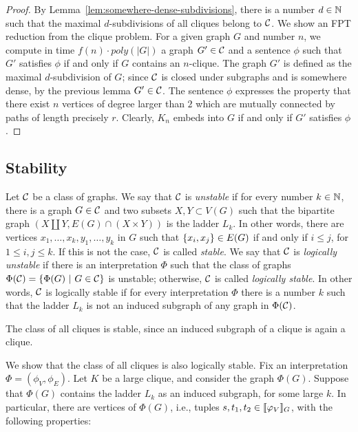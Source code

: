 \begin{proof}
  By Lemma~\ref{lem:somewhere-dense-subdivisions}, there is a number  $d\in\mathbb{N}$  such that the maximal $d$-subdivisions
  of all cliques belong to ${\cal C}$. 
  We show an FPT reduction 
    from the clique problem. For a given graph $G$ and number $n$, we compute in time $f(n)\cdot poly(|G|)$ a graph $G'\in{\cal C}$ and a sentence $\phi$ such that $G'$ satisfies $\phi$ if and only if $G$ contains an $n$-clique.
   The graph $G'$ is defined as the maximal $d$-subdivision of $G$; since ${\cal C}$ is closed under subgraphs and is somewhere dense, by the previous lemma $G'\in{\cal C}$. The sentence $\phi$ expresses the property that there exist $n$ vertices of degree larger than $2$ which 
  are mutually connected by paths of length precisely $r$.
  Clearly, $K_n$ embeds into $G$ if and only if $G'$
  satisfies $\phi$.
\end{proof}

\subsection{Stability}
Let ${\cal C}$ be a class of graphs.
We say that ${\cal C}$ is \emph{unstable} 
if for every number $k\in\mathbb{N}$, there is a  graph  $G\in{\cal C}$
and two subsets $X,Y\subset V(G)$
such that the bipartite graph $(X\coprod Y,E(G)\cap (X\times Y))$
is the ladder $L_k$. In other words, there are vertices $x_1,\ldots,x_k,y_1,\ldots,y_k$ in $G$ such that $\{x_i,x_j\}\in E(G)$ if and only if $i\le j$, for $1\le i,j\le k$.
If this is not the case, ${\cal C}$ is called \emph{stable}.
We say that ${\cal C}$ is \emph{logically unstable}
if there is an interpretation $\Phi$
such that the class of graphs $\Phi({\cal C})=\{\Phi(G)\ |\ G\in{\cal C}\}$
is unstable; otherwise, ${\cal C}$ is called \emph{logically stable}.
In other words, ${\cal C}$ is logically stable if for every
interpretation $\Phi$ there is a number $k$
such that the ladder $L_k$ is not an induced subgraph of any graph in $\Phi({\cal C})$.

\begin{example}\label{ex:cliques}
	The class of all cliques is stable, since an induced subgraph of a clique is again a clique.
	
	We show that the class of all cliques is also logically stable.
Fix an interpretation $\Phi=(\phi_V,\phi_E)$. Let $K$ be a large clique, and consider the graph $\Phi(G)$. Suppose that $\Phi(G)$ contains the ladder $L_k$ as an induced subgraph, for some large $k$.
In particular, there are vertices of $\Phi(G)$, i.e., tuples $s,t_1,t_2\in [\![\varphi_V]\!]_G$, with the following properties:
\end{example}

